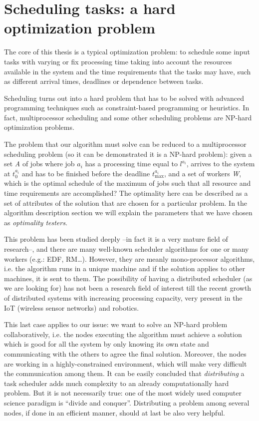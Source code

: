 \section{Scheduling tasks: a hard optimization problem}
The core of this thesis is a typical optimization problem: to schedule some input tasks with varying or fix processing time taking into account the resources available in the system and the time requirements that the tasks may have, such as different arrival times, deadlines or dependence between tasks.

Scheduling turns out into a hard problem that has to be solved with advanced programming techniques such as constraint-based programming or heuristics. In fact, multiprocessor scheduling and some other scheduling problems are NP-hard optimization problems.

The problem that our algorithm must solve can be reduced to a multiprocessor scheduling problem (so it can be demonstrated it is a NP-hard problem): given a set \emph{A} of jobs where job $a_i$ has a processing time equal to $l^{a_{i}}$, arrives to the system at $t_0^{a_i}$ and has to be finished before the deadline $t_{\text{max}}^{a_i}$, and a set of workers \emph{W}, which is the optimal schedule of the maximum of jobs such that all resource and time requirements are accomplished? The optimality here can be described as a set of attributes of the solution that are chosen for a particular problem. In the algorithm description section we will explain the parameters that we have chosen as \emph{optimality testers}.

This problem has been studied deeply --in fact it is a very mature field of research--, and there are many well-known scheduler algorithms for one or many workers (e.g.: EDF, RM…). However, they are meanly mono-processor algorithms, i.e. the algorithm runs in a unique machine and if the solution applies to other machines, it is sent to them. The possibility of having a distributed scheduler (as we are looking for) has not been a research field of interest till the recent growth of distributed systems with increasing processing capacity, very present in the IoT (wireless sensor networks) and robotics. 

This last case applies to our issue: we want to solve an NP-hard problem collaboratively, i.e. the nodes executing the algorithm must achieve a solution which is good for all the system by only knowing its own state and communicating with the others to agree the final solution. Moreover, the nodes are working in a highly-constrained environment, which will make very difficult the communication among them. It can be easily concluded that \emph{distributing} a task scheduler adds much complexity to an already computationally hard problem. But it is not necessarily true: one of the most widely used computer science paradigm is ``divide and conquer''. Distributing a problem among several nodes, if done in an efficient manner, should at last be also very helpful.

